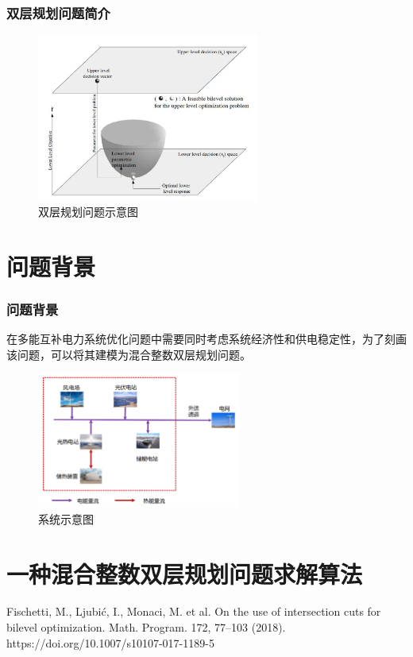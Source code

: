 \documentclass{beamer}
\begin{document}
\begin{frame}
	\frametitle{双层规划问题简介}
	\begin{figure}
		\centering
		\includegraphics[width=0.65\textwidth]{pic/双层问题示意图.png}
		\caption{双层规划问题示意图}
	\end{figure}
\end{frame}

\section{问题背景}

\begin{frame}
	\frametitle{问题背景} 
	在多能互补电力系统优化问题中需要同时考虑系统经济性和供电稳定性，为了刻画该问题，可以将其建模为混合整数双层规划问题。
	\begin{figure}
		\centering
		\includegraphics[width=0.6\textwidth]{pic/系统结构示意图.png}
		\caption{系统示意图}
	\end{figure}
\end{frame}

\section{一种混合整数双层规划问题求解算法} 

\begin{frame}
	Fischetti, M., Ljubić, I., Monaci, M. et al. On the use of intersection cuts for bilevel optimization. Math. Program. 172, 77–103 (2018). https://doi.org/10.1007/s10107-017-1189-5
\end{frame}
\end{document}
